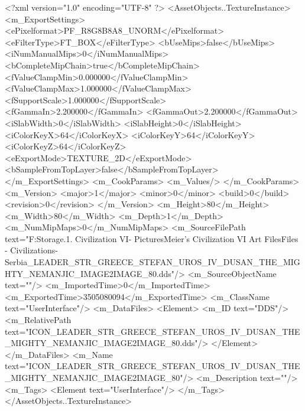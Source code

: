 <?xml version="1.0" encoding="UTF-8" ?>
<AssetObjects..TextureInstance>
	<m_ExportSettings>
		<ePixelformat>PF_R8G8B8A8_UNORM</ePixelformat>
		<eFilterType>FT_BOX</eFilterType>
		<bUseMips>false</bUseMips>
		<iNumManualMips>0</iNumManualMips>
		<bCompleteMipChain>true</bCompleteMipChain>
		<fValueClampMin>0.000000</fValueClampMin>
		<fValueClampMax>1.000000</fValueClampMax>
		<fSupportScale>1.000000</fSupportScale>
		<fGammaIn>2.200000</fGammaIn>
		<fGammaOut>2.200000</fGammaOut>
		<iSlabWidth>0</iSlabWidth>
		<iSlabHeight>0</iSlabHeight>
		<iColorKeyX>64</iColorKeyX>
		<iColorKeyY>64</iColorKeyY>
		<iColorKeyZ>64</iColorKeyZ>
		<eExportMode>TEXTURE_2D</eExportMode>
		<bSampleFromTopLayer>false</bSampleFromTopLayer>
	</m_ExportSettings>
	<m_CookParams>
		<m_Values/>
	</m_CookParams>
	<m_Version>
		<major>1</major>
		<minor>0</minor>
		<build>0</build>
		<revision>0</revision>
	</m_Version>
	<m_Height>80</m_Height>
	<m_Width>80</m_Width>
	<m_Depth>1</m_Depth>
	<m_NumMipMaps>0</m_NumMipMaps>
	<m_SourceFilePath text="F:\Mod Storage\2.1. Civilization VI\Mods\Archive - Pictures\Sid Meier's Civilization VI Art Files\Art Files - Civilizations\Civilization - Serbia\ICON_LEADER_STR_GREECE_STEFAN_UROS_IV_DUSAN_THE_MIGHTY_NEMANJIC_IMAGE2IMAGE_80.dds"/>
	<m_SourceObjectName text=""/>
	<m_ImportedTime>0</m_ImportedTime>
	<m_ExportedTime>3505080094</m_ExportedTime>
	<m_ClassName text="UserInterface"/>
	<m_DataFiles>
		<Element>
			<m_ID text="DDS"/>
			<m_RelativePath text="ICON_LEADER_STR_GREECE_STEFAN_UROS_IV_DUSAN_THE_MIGHTY_NEMANJIC_IMAGE2IMAGE_80.dds"/>
		</Element>
	</m_DataFiles>
	<m_Name text="ICON_LEADER_STR_GREECE_STEFAN_UROS_IV_DUSAN_THE_MIGHTY_NEMANJIC_IMAGE2IMAGE_80"/>
	<m_Description text=""/>
	<m_Tags>
		<Element text="UserInterface"/>
	</m_Tags>
</AssetObjects..TextureInstance>

